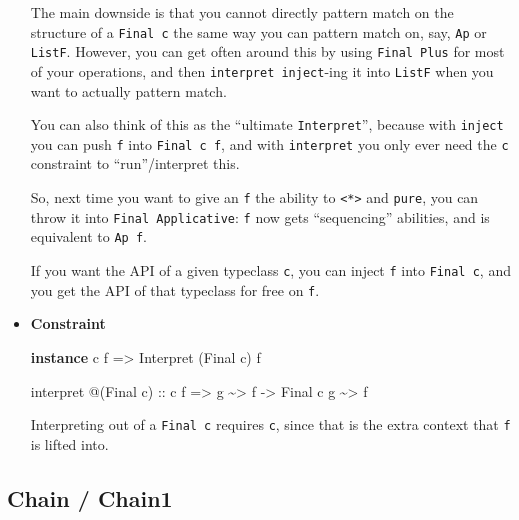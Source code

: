 \documentclass[]{article}
\newenvironment{Shaded}{}{}
\newcommand{\DataTypeTok}[1]{\textcolor[rgb]{0.56,0.13,0.00}{#1}}
\newcommand{\KeywordTok}[1]{\textcolor[rgb]{0.00,0.44,0.13}{\textbf{#1}}}
\newcommand{\NormalTok}[1]{#1}
\newcommand{\OperatorTok}[1]{\textcolor[rgb]{0.40,0.40,0.40}{#1}}
\newcommand{\OtherTok}[1]{\textcolor[rgb]{0.00,0.44,0.13}{#1}}
\begin{document}
\begin{itemize}
  The main downside is that you cannot directly pattern match on the structure
  of a \texttt{Final\ c} the same way you can pattern match on, say, \texttt{Ap}
  or \texttt{ListF}. However, you can get often around this by using
  \texttt{Final\ Plus} for most of your operations, and then
  \texttt{interpret\ inject}-ing it into \texttt{ListF} when you want to
  actually pattern match.

  You can also think of this as the ``ultimate \texttt{Interpret}'', because
  with \texttt{inject} you can push \texttt{f} into \texttt{Final\ c\ f}, and
  with \texttt{interpret} you only ever need the \texttt{c} constraint to
  ``run''/interpret this.

  So, next time you want to give an \texttt{f} the ability to
  \texttt{\textless{}*\textgreater{}} and \texttt{pure}, you can throw it into
  \texttt{Final\ Applicative}: \texttt{f} now gets ``sequencing'' abilities, and
  is equivalent to \texttt{Ap\ f}.

  If you want the API of a given typeclass \texttt{c}, you can inject \texttt{f}
  into \texttt{Final\ c}, and you get the API of that typeclass for free on
  \texttt{f}.
\item
  \textbf{Constraint}

\begin{Shaded}
\begin{Highlighting}[]
\KeywordTok{instance}\NormalTok{ c f }\OtherTok{=\textgreater{}} \DataTypeTok{Interpret}\NormalTok{ (}\DataTypeTok{Final}\NormalTok{ c) f}

\NormalTok{interpret }\OperatorTok{@}\NormalTok{(}\DataTypeTok{Final}\NormalTok{ c)}
\OtherTok{    ::}\NormalTok{ c f}
    \OtherTok{=\textgreater{}}\NormalTok{ g }\OperatorTok{\textasciitilde{}\textgreater{}}\NormalTok{ f}
    \OtherTok{{-}\textgreater{}} \DataTypeTok{Final}\NormalTok{ c g }\OperatorTok{\textasciitilde{}\textgreater{}}\NormalTok{ f}
\end{Highlighting}
\end{Shaded}

  Interpreting out of a \texttt{Final\ c} requires \texttt{c}, since that is the
  extra context that \texttt{f} is lifted into.
\end{itemize}

\subsection{Chain / Chain1}\label{chain-chain1}
\end{document}

